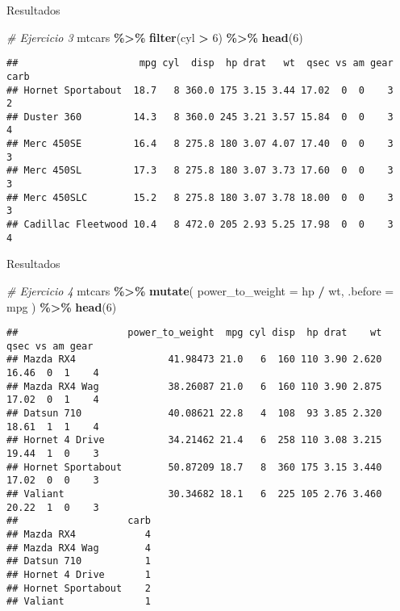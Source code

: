 \documentclass[
  ignorenonframetext,
]{beamer}
\newenvironment{Shaded}{\begin{snugshade}}{\end{snugshade}}
\newcommand{\AttributeTok}[1]{\textcolor[rgb]{0.13,0.29,0.53}{#1}}
\newcommand{\CommentTok}[1]{\textcolor[rgb]{0.56,0.35,0.01}{\textit{#1}}}
\newcommand{\DecValTok}[1]{\textcolor[rgb]{0.00,0.00,0.81}{#1}}
\newcommand{\FunctionTok}[1]{\textcolor[rgb]{0.13,0.29,0.53}{\textbf{#1}}}
\newcommand{\NormalTok}[1]{#1}
\newcommand{\SpecialCharTok}[1]{\textcolor[rgb]{0.81,0.36,0.00}{\textbf{#1}}}
\begin{document}
\begin{frame}[fragile]{Resultados}
\label{resultados-7}
\begin{Shaded}
\begin{Highlighting}[]
\CommentTok{\# Ejercicio 3}
\NormalTok{mtcars }\SpecialCharTok{\%\textgreater{}\%}
  \FunctionTok{filter}\NormalTok{(cyl }\SpecialCharTok{\textgreater{}} \DecValTok{6}\NormalTok{) }\SpecialCharTok{\%\textgreater{}\%} 
  \FunctionTok{head}\NormalTok{(}\DecValTok{6}\NormalTok{)}
\end{Highlighting}
\end{Shaded}

\begin{verbatim}
##                     mpg cyl  disp  hp drat   wt  qsec vs am gear carb
## Hornet Sportabout  18.7   8 360.0 175 3.15 3.44 17.02  0  0    3    2
## Duster 360         14.3   8 360.0 245 3.21 3.57 15.84  0  0    3    4
## Merc 450SE         16.4   8 275.8 180 3.07 4.07 17.40  0  0    3    3
## Merc 450SL         17.3   8 275.8 180 3.07 3.73 17.60  0  0    3    3
## Merc 450SLC        15.2   8 275.8 180 3.07 3.78 18.00  0  0    3    3
## Cadillac Fleetwood 10.4   8 472.0 205 2.93 5.25 17.98  0  0    3    4
\end{verbatim}
\end{frame}

\begin{frame}[fragile]{Resultados}
\label{resultados-8}
\begin{Shaded}
\begin{Highlighting}[]
\CommentTok{\# Ejercicio 4}
\NormalTok{mtcars }\SpecialCharTok{\%\textgreater{}\%}
  \FunctionTok{mutate}\NormalTok{(}
    \AttributeTok{power\_to\_weight =}\NormalTok{ hp }\SpecialCharTok{/}\NormalTok{ wt,}
    \AttributeTok{.before =}\NormalTok{ mpg}
\NormalTok{    ) }\SpecialCharTok{\%\textgreater{}\%} 
  \FunctionTok{head}\NormalTok{(}\DecValTok{6}\NormalTok{)}
\end{Highlighting}
\end{Shaded}

\begin{verbatim}
##                   power_to_weight  mpg cyl disp  hp drat    wt  qsec vs am gear
## Mazda RX4                41.98473 21.0   6  160 110 3.90 2.620 16.46  0  1    4
## Mazda RX4 Wag            38.26087 21.0   6  160 110 3.90 2.875 17.02  0  1    4
## Datsun 710               40.08621 22.8   4  108  93 3.85 2.320 18.61  1  1    4
## Hornet 4 Drive           34.21462 21.4   6  258 110 3.08 3.215 19.44  1  0    3
## Hornet Sportabout        50.87209 18.7   8  360 175 3.15 3.440 17.02  0  0    3
## Valiant                  30.34682 18.1   6  225 105 2.76 3.460 20.22  1  0    3
##                   carb
## Mazda RX4            4
## Mazda RX4 Wag        4
## Datsun 710           1
## Hornet 4 Drive       1
## Hornet Sportabout    2
## Valiant              1
\end{verbatim}
\end{frame}
\end{document}
